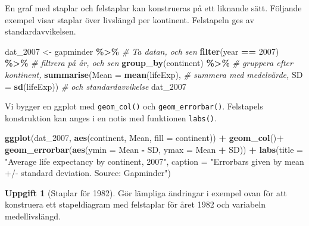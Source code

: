 \documentclass[
]{book}
\newenvironment{Shaded}{\begin{snugshade}}{\end{snugshade}}
\newcommand{\AttributeTok}[1]{\textcolor[rgb]{0.13,0.29,0.53}{#1}}
\newcommand{\CommentTok}[1]{\textcolor[rgb]{0.56,0.35,0.01}{\textit{#1}}}
\newcommand{\DecValTok}[1]{\textcolor[rgb]{0.00,0.00,0.81}{#1}}
\newcommand{\FunctionTok}[1]{\textcolor[rgb]{0.13,0.29,0.53}{\textbf{#1}}}
\newcommand{\NormalTok}[1]{#1}
\newcommand{\OtherTok}[1]{\textcolor[rgb]{0.56,0.35,0.01}{#1}}
\newcommand{\SpecialCharTok}[1]{\textcolor[rgb]{0.81,0.36,0.00}{\textbf{#1}}}
\newcommand{\StringTok}[1]{\textcolor[rgb]{0.31,0.60,0.02}{#1}}
\theoremstyle{definition}
\theoremstyle{definition}
\theoremstyle{definition}
\newtheorem{exercise}{Uppgift}[chapter]
\theoremstyle{definition}
\theoremstyle{remark}
\begin{document}
En graf med staplar och felstaplar kan konstrueras på ett liknande sätt. Följande exempel visar staplar över livslängd per kontinent. Felstapeln ges av standardavvikelsen.

\begin{Shaded}
\begin{Highlighting}[]
\NormalTok{dat\_2007 }\OtherTok{\textless{}{-}}\NormalTok{ gapminder }\SpecialCharTok{\%\textgreater{}\%}          \CommentTok{\# Ta datan, och sen}
  \FunctionTok{filter}\NormalTok{(year }\SpecialCharTok{==} \DecValTok{2007}\NormalTok{) }\SpecialCharTok{\%\textgreater{}\%}        \CommentTok{\# filtrera på år, och sen}
  \FunctionTok{group\_by}\NormalTok{(continent) }\SpecialCharTok{\%\textgreater{}\%}         \CommentTok{\# gruppera efter kontinent,}
  \FunctionTok{summarise}\NormalTok{(}\AttributeTok{Mean =} \FunctionTok{mean}\NormalTok{(lifeExp), }\CommentTok{\# summera med medelvärde,}
            \AttributeTok{SD =} \FunctionTok{sd}\NormalTok{(lifeExp))     }\CommentTok{\# och standardavvikelse}
\NormalTok{dat\_2007}
\end{Highlighting}
\end{Shaded}

Vi bygger en ggplot med \texttt{geom\_col()} och \texttt{geom\_errorbar()}. Felstapels konstruktion kan anges i en notis med funktionen \texttt{labs()}.

\begin{Shaded}
\begin{Highlighting}[]
\FunctionTok{ggplot}\NormalTok{(dat\_2007, }\FunctionTok{aes}\NormalTok{(continent, Mean, }\AttributeTok{fill =}\NormalTok{ continent)) }\SpecialCharTok{+}
  \FunctionTok{geom\_col}\NormalTok{()}\SpecialCharTok{+}                                            
  \FunctionTok{geom\_errorbar}\NormalTok{(}\FunctionTok{aes}\NormalTok{(}\AttributeTok{ymin =}\NormalTok{ Mean }\SpecialCharTok{{-}}\NormalTok{ SD, }\AttributeTok{ymax =}\NormalTok{ Mean }\SpecialCharTok{+}\NormalTok{ SD)) }\SpecialCharTok{+}
  \FunctionTok{labs}\NormalTok{(}\AttributeTok{title =} \StringTok{"Average life expectancy by continent, 2007"}\NormalTok{,}
       \AttributeTok{caption =} \StringTok{"Errorbars given by mean +/{-} standard deviation.}
\StringTok{       Source: Gapminder"}\NormalTok{)}
\end{Highlighting}
\end{Shaded}

\begin{exercise}[Staplar för 1982]
Gör lämpliga ändringar i exempel ovan för att konstruera ett stapeldiagram med felstaplar för året 1982 och variabeln medellivslängd.
\end{exercise}
\end{document}
